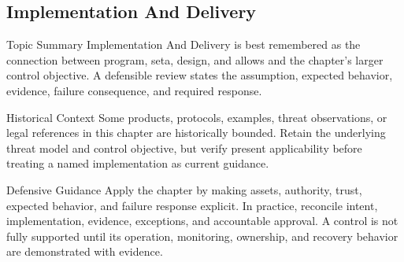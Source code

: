 \documentclass[11pt,letterpaper]{article}
\begin{document}
\subsection*{Implementation And Delivery}
\begin{CornellNotesTable}
\end{CornellNotesTable}
\begin{CornellSummaryBox}{Topic Summary}
Implementation And Delivery is best remembered as the connection between program, seta, design, and allows and the chapter's larger control objective. A defensible review states the assumption, expected behavior, evidence, failure consequence, and required response.
\end{CornellSummaryBox}
\begin{CornellWarningBox}{Historical Context}
Some products, protocols, examples, threat observations, or legal references in this chapter are historically bounded. Retain the underlying threat model and control objective, but verify present applicability before treating a named implementation as current guidance.
\end{CornellWarningBox}
\begin{CornellOverviewBox}{Defensive Guidance}
Apply the chapter by making assets, authority, trust, expected behavior, and failure response explicit. In practice, reconcile intent, implementation, evidence, exceptions, and accountable approval. A control is not fully supported until its operation, monitoring, ownership, and recovery behavior are demonstrated with evidence.
\end{CornellOverviewBox}
\end{document}
